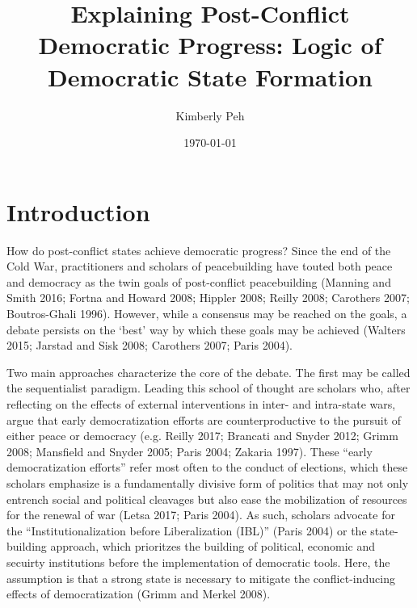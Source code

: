 \documentclass [11pt]{article}
\title{Explaining Post-Conflict Democratic Progress: Logic of Democratic State Formation}
\author{Kimberly Peh}
\date{\today}
\begin{document}
\maketitle

\section*{Introduction} 

How do post-conflict states achieve democratic progress? Since the end of the Cold War, practitioners and scholars of peacebuilding have touted both peace and democracy as the twin goals of post-conflict peacebuilding (Manning and Smith 2016; Fortna and Howard 2008; Hippler 2008; Reilly 2008; Carothers 2007; Boutros-Ghali 1996). However, while a consensus may be reached on the goals, a debate persists on the `best' way by which these goals may be achieved (Walters 2015; Jarstad and Sisk 2008; Carothers 2007; Paris 2004).

Two main approaches characterize the core of the debate. The first may be called the sequentialist paradigm. Leading this school of thought are scholars who, after reflecting on the effects of external interventions in inter- and intra-state wars, argue that early democratization efforts are counterproductive to the pursuit of either peace or democracy (e.g. Reilly 2017; Brancati and Snyder 2012; Grimm 2008; Mansfield and Snyder 2005; Paris 2004; Zakaria 1997). These ``early democratization efforts'' refer most often to the conduct of elections, which these scholars emphasize is a fundamentally divisive form of politics that may not only entrench social and political cleavages but also ease the mobilization of resources for the renewal of war (Letsa 2017; Paris 2004). As such, scholars advocate for the ``Institutionalization before Liberalization (IBL)'' (Paris 2004) or the state-building approach, which prioritzes the building of political, economic and secuirty institutions before the implementation of democratic tools. Here, the assumption is that a strong state is necessary to mitigate the conflict-inducing effects of democratization (Grimm and Merkel 2008).
\end{document}
